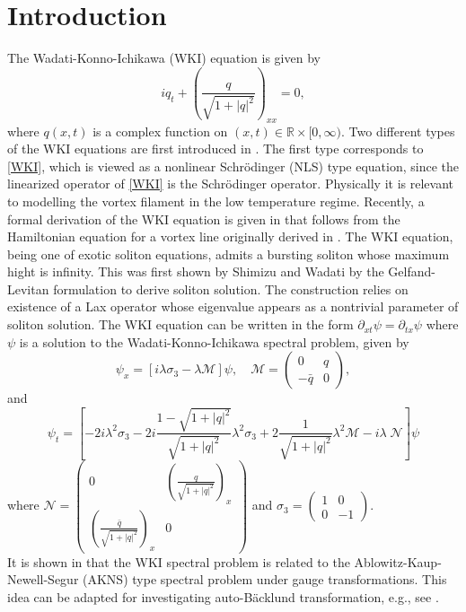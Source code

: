 \documentclass[11pt]{article}
\newcommand{\RR}{{\mathbb R}}
\begin{document}
\section{Introduction}
The Wadati-Konno-Ichikawa (WKI) equation is given by
\begin{equation} \label{WKI}
iq_t+\left(\frac{q}{\sqrt{1+|q|^2}}\right)_{xx}=0, 
\end{equation}
where $q(x,t)$ is a complex function on $(x,t)\in \RR\times [0,\infty)$. Two different types of the WKI equations are first introduced in \cite{Wadati-Konno-Ichikawa-1979}. The first type corresponds to \eqref{WKI}, which is viewed as a nonlinear Schr\"{o}dinger (NLS) type equation, since the linearized operator of \eqref{WKI} is the Schr\"{o}dinger operator. Physically it is relevant to modelling the vortex filament in the low temperature regime. Recently, a formal derivation of the WKI equation is given in \cite{Gorder-2016} that follows from the Hamiltonian equation for a vortex line originally derived in \cite{Svistunov-1995}. The WKI equation, being one of exotic soliton equations, admits a bursting soliton whose maximum hight is infinity. This was first shown by Shimizu and Wadati \cite{Shimizu-Wadati-1980} by the Gelfand-Levitan formulation to derive soliton solution. The construction relies on existence of a Lax operator whose eigenvalue appears as a nontrivial parameter of soliton solution. The WKI equation can be written in the form $\partial_{xt}\psi=\partial_{tx}\psi$ where $\psi$ is a solution to the Wadati-Konno-Ichikawa spectral problem, given by  
\begin{equation} \label{WKI-spectral}
\psi_x=[i\lambda \sigma_3-\lambda \mathcal{M}]\psi, \quad \mathcal{M}=\begin{pmatrix} 0 & q\\ -\bar{q} & 0 \end{pmatrix},
\end{equation} 
and
\begin{equation} \label{WKI-spectral-t}
\psi_t=[-2i\lambda^2\sigma_3-2i\frac{1-\sqrt{1+|q|^2}}{\sqrt{1+|q|^2}}\lambda^2\sigma_3+2\frac{1}{\sqrt{1+|q|^2}}\lambda^2 \mathcal{M}-i\lambda \; \mathcal{N}]\psi 
\end{equation}
where $ \mathcal{N}=\begin{pmatrix} 0 & \left(\frac{q}{\sqrt{1+|q|^2}}\right)_x\\ \left(\frac{\bar{q}}{\sqrt{1+|q|^2}}\right)_x & 0 \end{pmatrix}$ and $\sigma_3=\begin{pmatrix} 1 & 0\\ 0 &-1\end{pmatrix}.$\\
It is shown in \cite{Wadati-Sogo-1983, Ishimori-1982} that the WKI spectral problem is related to the Ablowitz-Kaup-Newell-Segur (AKNS) type spectral problem under gauge transformations. This idea can be adapted for investigating auto-B\"{a}cklund transformation, e.g., see \cite{Boiti-Gerdjikov-Pempinelli-1986, Kundu-1987, Levi-Ragnisco-Sym-1984}.
 
\end{document}
